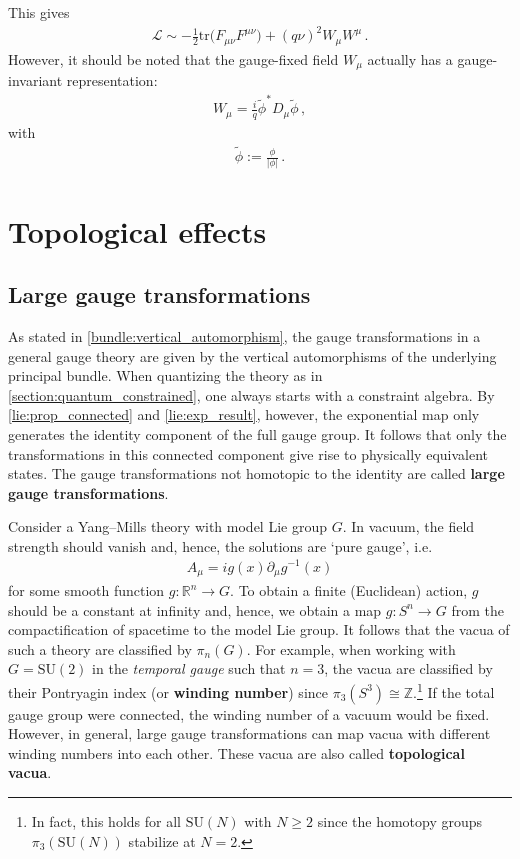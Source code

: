     This gives
    \begin{gather}
        \mathcal{L}\sim -\frac{1}{2}\mathrm{tr}\bigl(F_{\mu\nu}F^{\mu\nu}\bigr)+(q\nu)^2W_\mu W^\mu\,.
    \end{gather}
    However, it should be noted that the gauge-fixed field $W_\mu$ actually has a gauge-invariant representation:
    \begin{gather}
        W_\mu = \frac{i}{q}\widetilde{\phi}^*D_\mu\widetilde{\phi}\,,
    \end{gather}
    with
    \begin{gather}
        \widetilde{\phi} := \frac{\phi}{|\phi|}\,.
    \end{gather}


\section{Topological effects}
\subsection{Large gauge transformations}

    As stated in \cref{bundle:vertical_automorphism}, the gauge transformations in a general gauge theory are given by the vertical automorphisms of the underlying principal bundle. When quantizing the theory as in \cref{section:quantum_constrained}, one always starts with a constraint algebra. By \cref{lie:prop_connected} and \cref{lie:exp_result}, however, the exponential map only generates the identity component of the full gauge group. It follows that only the transformations in this connected component give rise to physically equivalent states. The gauge transformations not homotopic to the identity are called \textbf{large gauge transformations}. 

    Consider a Yang--Mills theory with model Lie group $G$. In vacuum, the field strength should vanish and, hence, the solutions are `pure gauge', i.e.
    \begin{gather}
        A_\mu = ig(x)\partial_\mu g^{-1}(x)
    \end{gather}
    for some smooth function $g:\mathbb{R}^n\rightarrow G$. To obtain a finite (Euclidean) action, $g$ should be a constant at infinity and, hence, we obtain a map $g:S^n\rightarrow G$ from the compactification of spacetime to the model Lie group. It follows that the vacua of such a theory are classified by $\pi_n(G)$. For example, when working with $G=\mathrm{SU}(2)$ in the \textit{temporal gauge} such that $n=3$, the vacua are classified by their Pontryagin index (or \textbf{winding number}) since $\pi_3(S^3)\cong\mathbb{Z}$.\footnote{In fact, this holds for all $\mathrm{SU}(N)$ with $N\geq2$ since the homotopy groups $\pi_3(\mathrm{SU}(N))$ stabilize at $N=2$.} If the total gauge group were connected, the winding number of a vacuum would be fixed. However, in general, large gauge transformations can map vacua with different winding numbers into each other. These vacua are also called \textbf{topological vacua}.

